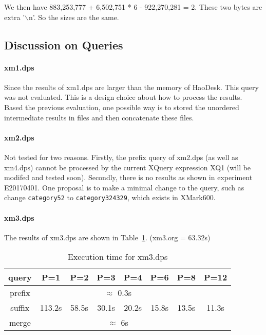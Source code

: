We then have 883,253,777 + 6,502,751 * 6 - 922,270,281 = 2. These two bytes
are extra '$\backslash$n'. So the sizes are the same.



\subsection{Discussion on Queries}


\paragraph{xm1.dps}

Since the results of xm1.dps are larger than the memory of 
HaoDesk. This query was not evaluated. This is a design 
choice about how to process the results. Based the previous 
evaluation, one possible way is to stored the unordered intermediate 
results in files and then concatenate these files.

\paragraph{xm2.dps}

Not tested for two reasons. Firstly, the prefix query of xm2.dps (as well
as xm4.dps) cannot be processed by the current XQuery expression XQ1
(will be modifed and tested soon). Secondly, there is no results as 
shown in experiment E20170401. One proposal is to  make a minimal 
change to the query, such as change \texttt{category52} to 
 \texttt{category324329}, which exists in XMark600.



\paragraph{xm3.dps}

The results of xm3.dps are shown in Table~\ref{tab:xm3dps}.
(xm3.org = 63.32s) 

\begin{table}
	\centering
	\label{tab:xm3dps}
	\caption{Execution time for xm3.dps}
	\begin{tabular}{c|c|c|c|c|c|c|c}
		\hline
		query    &  P=1  &  P=2   &  P=3  &  P=4 &   P=6 &    P=8 & P=12   \\
		\hline
		prefix    &   \multicolumn{6}{|c}{$\approx$ 0.3s}    \\
		\hline
		suffix    & 113.2s&  58.5s &  30.1s&  20.2s & 15.8s&   13.5s & 11.3s \\ 
		\hline
		merge     &   \multicolumn{6}{|c}{$\approx$ 6s}    \\
		\hline
	\end{tabular} 
\end{table} 

